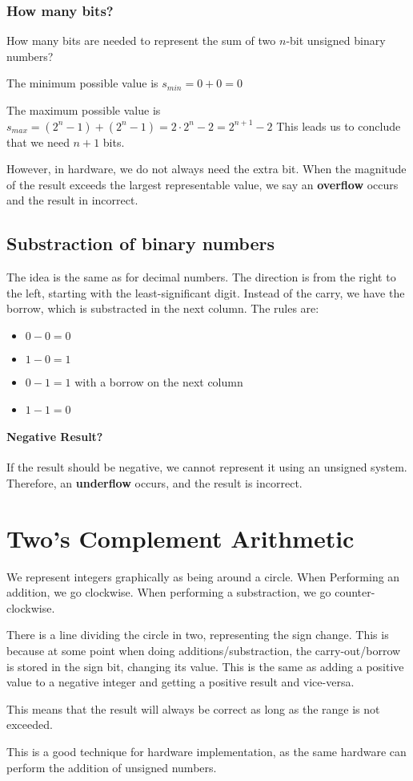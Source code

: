 \documentclass[10pt,a4paper]{book}
\begin{document}
\subsubsection{How many bits?}
How many bits are needed to represent the sum of two $n$-bit unsigned binary numbers?\par 
The minimum possible value is $s_{min}=0+0=0$\par 
The maximum possible value is $s_{max}=(2^n-1)+(2^n-1)=2\cdot 2^n-2=2^{n+1}-2$ This leads us to conclude that we need $n+1$ bits.\par 
However, in hardware, we do not always need the extra bit. When the magnitude of the result exceeds the largest representable value, we say an \textbf{overflow} occurs and the result in incorrect.

\subsection{Substraction of binary numbers}
The idea is the same as for decimal numbers. The direction is from the right to the left, starting with the least-significant digit. Instead of the carry, we have the borrow, which is substracted in the next column. The rules are:
\begin{itemize}
\item $0-0=0$
\item $1-0=1$
\item $0-1=1$ with a borrow on the next column
\item $1-1=0$
\end{itemize}

\paragraph{Negative Result?}
If the result should be negative, we cannot represent it using an unsigned system. Therefore, an \textbf{underflow} occurs, and the result is incorrect.

\section{Two's Complement Arithmetic}
We represent integers graphically as being around a circle. When Performing an addition, we go clockwise. When performing a substraction, we go counter-clockwise.\par 
There is a line dividing the circle in two, representing the sign change. This is because at some point when doing additions/substraction, the carry-out/borrow is stored in the sign bit, changing its value. This is the same as adding a positive value to a negative integer and getting a positive result and vice-versa.\par 
This means that the result will always be correct as long as the range is not exceeded.\par
This is a good technique for hardware implementation, as the same hardware can perform the addition of unsigned numbers.
\end{document}
